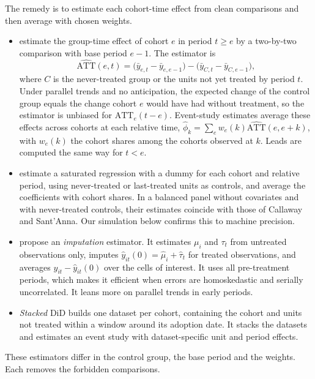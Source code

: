 The remedy is to estimate each cohort-time effect from clean comparisons and then average with chosen weights.
\begin{itemize}
\item \citet{CallawaySantAnna2021} estimate the group-time effect of cohort $e$ in period $t\ge e$ by a two-by-two
comparison with base period $e-1$. The estimator is
\begin{equation*}
\widehat{\mathrm{ATT}}(e,t)=\big(\bar y_{e,t}-\bar y_{e,e-1}\big)-\big(\bar y_{C,t}-\bar y_{C,e-1}\big),
\end{equation*}
where $C$ is the never-treated group or the units not yet treated by period $t$. Under parallel trends and no
anticipation, the expected change of the control group equals the change cohort $e$ would have had without
treatment, so the estimator is unbiased for $\mathrm{ATT}_e(t-e)$. Event-study estimates average these effects
across cohorts at each relative time, $\hat\phi_k=\sum_e w_e(k)\widehat{\mathrm{ATT}}(e,e+k)$, with $w_e(k)$ the
cohort shares among the cohorts observed at $k$. Leads are computed the same way for $t<e$.
\item \citet{SunAbraham2021} estimate a saturated regression with a dummy for each cohort and relative period,
using never-treated or last-treated units as controls, and average the coefficients with cohort shares. In a
balanced panel without covariates and with never-treated controls, their estimates coincide with those of Callaway
and Sant'Anna. Our simulation below confirms this to machine precision.
\item \citet{BorusyakJaravelSpiess2024} propose an \emph{imputation} estimator. It estimates $\mu_i$ and $\tau_t$
from untreated observations only, imputes $\hat y_{it}(0)=\hat\mu_i+\hat\tau_t$ for treated observations, and
averages $y_{it}-\hat y_{it}(0)$ over the cells of interest. It uses all pre-treatment periods, which makes it
efficient when errors are homoskedastic and serially uncorrelated. It leans more on parallel trends in early
periods.
\item \emph{Stacked} DiD \citep{CengizEtAl2019} builds one dataset per cohort, containing the cohort and units not
treated within a window around its adoption date. It stacks the datasets and estimates an event study with
dataset-specific unit and period effects.
\end{itemize}
These estimators differ in the control group, the base period and the weights. Each removes the forbidden
comparisons.


